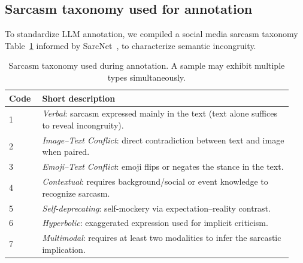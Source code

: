 \documentclass[conference]{IEEEtran}
\begin{document}
\subsection{Sarcasm taxonomy used for annotation}
\label{sec:sarcasm-def}
To standardize LLM annotation, we compiled a social media sarcasm taxonomy Table~\ref{tab:sarcasm-taxonomy} informed by SarcNet~\cite{yue-etal-2024-sarcnet}, to characterize semantic incongruity.
\begin{table}[t]
\centering
\footnotesize
\setlength{\tabcolsep}{4pt}
\begin{tabular}{p{0.11\linewidth}p{0.83\linewidth}}
\toprule
\textbf{Code} & \textbf{Short description} \\
\midrule
1 & \textit{Verbal}: sarcasm expressed mainly in the text (text alone suffices to reveal incongruity). \\
2 & \textit{Image--Text Conflict}: direct contradiction between text and image when paired. \\
3 & \textit{Emoji--Text Conflict}: emoji flips or negates the stance in the text. \\
4 & \textit{Contextual}: requires background/social or event knowledge to recognize sarcasm. \\
5 & \textit{Self-deprecating}: self-mockery via expectation--reality contrast. \\
6 & \textit{Hyperbolic}: exaggerated expression used for implicit criticism. \\
7 & \textit{Multimodal}: requires at least two modalities to infer the sarcastic implication. \\
\bottomrule
\end{tabular}
\caption{Sarcasm taxonomy used during annotation. A sample may exhibit multiple types simultaneously.}
\label{tab:sarcasm-taxonomy}
\end{table}
\end{document}

